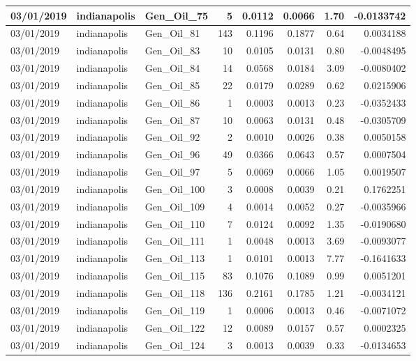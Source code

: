 \documentclass[
  letterpaper,
  DIV=11,
  numbers=noendperiod]{scrartcl}
\begin{document}
\begin{tabular}{l|l|l|r|r|r|r|r}
\hline
03/01/2019 & indianapolis & Gen\_Oil\_75 & 5 & 0.0112 & 0.0066 & 1.70 & -0.0133742\\
\hline
03/01/2019 & indianapolis & Gen\_Oil\_81 & 143 & 0.1196 & 0.1877 & 0.64 & 0.0034188\\
\hline
03/01/2019 & indianapolis & Gen\_Oil\_83 & 10 & 0.0105 & 0.0131 & 0.80 & -0.0048495\\
\hline
03/01/2019 & indianapolis & Gen\_Oil\_84 & 14 & 0.0568 & 0.0184 & 3.09 & -0.0080402\\
\hline
03/01/2019 & indianapolis & Gen\_Oil\_85 & 22 & 0.0179 & 0.0289 & 0.62 & 0.0215906\\
\hline
03/01/2019 & indianapolis & Gen\_Oil\_86 & 1 & 0.0003 & 0.0013 & 0.23 & -0.0352433\\
\hline
03/01/2019 & indianapolis & Gen\_Oil\_87 & 10 & 0.0063 & 0.0131 & 0.48 & -0.0305709\\
\hline
03/01/2019 & indianapolis & Gen\_Oil\_92 & 2 & 0.0010 & 0.0026 & 0.38 & 0.0050158\\
\hline
03/01/2019 & indianapolis & Gen\_Oil\_96 & 49 & 0.0366 & 0.0643 & 0.57 & 0.0007504\\
\hline
03/01/2019 & indianapolis & Gen\_Oil\_97 & 5 & 0.0069 & 0.0066 & 1.05 & 0.0019507\\
\hline
03/01/2019 & indianapolis & Gen\_Oil\_100 & 3 & 0.0008 & 0.0039 & 0.21 & 0.1762251\\
\hline
03/01/2019 & indianapolis & Gen\_Oil\_109 & 4 & 0.0014 & 0.0052 & 0.27 & -0.0035966\\
\hline
03/01/2019 & indianapolis & Gen\_Oil\_110 & 7 & 0.0124 & 0.0092 & 1.35 & -0.0190680\\
\hline
03/01/2019 & indianapolis & Gen\_Oil\_111 & 1 & 0.0048 & 0.0013 & 3.69 & -0.0093077\\
\hline
03/01/2019 & indianapolis & Gen\_Oil\_113 & 1 & 0.0101 & 0.0013 & 7.77 & -0.1641633\\
\hline
03/01/2019 & indianapolis & Gen\_Oil\_115 & 83 & 0.1076 & 0.1089 & 0.99 & 0.0051201\\
\hline
03/01/2019 & indianapolis & Gen\_Oil\_118 & 136 & 0.2161 & 0.1785 & 1.21 & -0.0034121\\
\hline
03/01/2019 & indianapolis & Gen\_Oil\_119 & 1 & 0.0006 & 0.0013 & 0.46 & -0.0071072\\
\hline
03/01/2019 & indianapolis & Gen\_Oil\_122 & 12 & 0.0089 & 0.0157 & 0.57 & 0.0002325\\
\hline
03/01/2019 & indianapolis & Gen\_Oil\_124 & 3 & 0.0013 & 0.0039 & 0.33 & -0.0134653\\

\end{tabular}
\end{document}
